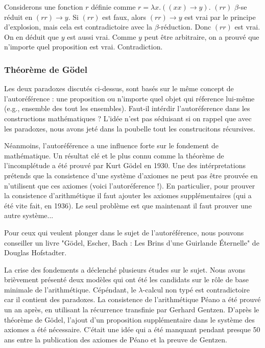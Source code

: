 \documentclass[12pt, a4paper]{article}
\begin{document}
{\footnotesize
	Considerons une fonction $r$ définie comme $r=\lambda x.((x x) \to y)$.
	$(r r)$ $\beta$-se réduit en $(r r) \to y$.
	Si $(r r)$ est faux, alors $(r r) \to y$ est vrai par le principe d'explosion, mais cela est contradictoire avec la $\beta$-réduction.
	Donc $(r r)$ est vrai.
	On en déduit que $y$ est aussi vrai.
	Comme $y$ peut être arbitraire, on a prouvé que n'importe quel proposition est vrai.
	Contradiction.
}

\subsubsection*{Théorème de Gödel}
Les deux paradoxes discutés ci-dessus, sont basés sur le même concept de l'autoréférence : une proposition ou n'importe quel objet qui réference lui-même (e.g., ensemble des tout les ensembles).
Faut-il intérdir l'autoréference dans les constructions mathématiques ?
L'idée n'est pas séduisant si on rappel que avec les paradoxes, nous avons jeté dans la poubelle tout les construcitons récursives.

Néanmoins, l'autoréférence a une influence forte sur le fondement de mathématique.
Un résultat clé et le plus connu comme la théorème de l'incomplétude a été prouvé par Kurt Gödel en 1930.
Une des intérpretations prétends que la consistence d'une système d'axiomes ne peut pas être prouvée en n'utilisent que ces axiomes (voici l'autoréference !). En particulier, pour prouver la consistence d'arithmétique il faut ajouter les axiomes supplémentaires (qui a été vite fait, en 1936). Le seul problème est que maintenant il faut prouver une autre système...

{\footnotesize
	Pour ceux qui veulent plonger dans le sujet de l'autoréférence, nous pouvons conseiller un livre "Gödel, Escher, Bach : Les Brins d'une Guirlande Éternelle" de Douglas Hofstadter.
}

La crise des fondements a déclenché plusieurs études sur le sujet.
Nous avons brièvement présenté deux modèles qui ont été les candidats sur le rôle de base minimale de l'arithmétique.
Cépéndant, le $\lambda$-calcul non typé est contradictoire car il contient des paradoxes.
La consistence de l'arithmétique Péano a été prouvé un an après, en utilisant la récurrence transfinie par Gerhard Gentzen.
D'après le théorème de Gödel, l'ajout d'un proposition supplémentaire dans le système des axiomes a été nécessaire.
C'était une idée qui a été manquant pendant presque 50 ans entre la publication des axiomes de Péano et la preuve de Gentzen.
\end{document}
